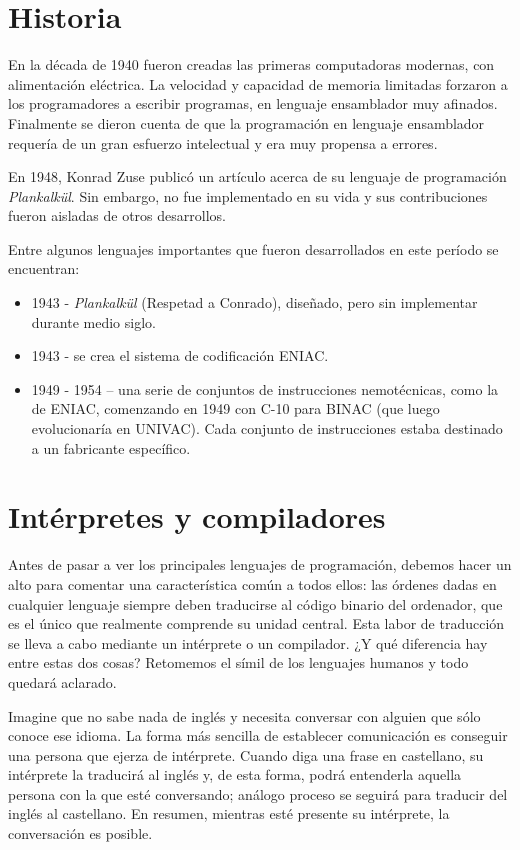 \documentclass[twoside,twocolumn]{article}
\begin{document}
\section{Historia}

En la década de 1940 fueron creadas las primeras computadoras modernas, con alimentación eléctrica. La velocidad y capacidad de memoria limitadas forzaron a los programadores a escribir programas, en lenguaje ensamblador muy afinados. Finalmente se dieron cuenta de que la programación en lenguaje ensamblador requería de un gran esfuerzo intelectual y era muy propensa a errores.

En 1948, Konrad Zuse publicó un artículo acerca de su lenguaje de programación \textit{Plankalkül}. Sin embargo, no fue implementado en su vida y sus contribuciones fueron aisladas de otros desarrollos.

Entre algunos lenguajes importantes que fueron desarrollados en este período se encuentran: 
\begin{itemize}
\item     1943 - \textit{Plankalkül} (Respetad a Conrado), diseñado, pero sin implementar durante medio siglo.
\item   1943 - se crea el sistema de codificación ENIAC.
\item  1949 - 1954 -- una serie de conjuntos de instrucciones nemotécnicas, como la de ENIAC, comenzando en 1949 con C-10 para BINAC (que luego evolucionaría en UNIVAC). Cada conjunto de instrucciones estaba destinado a un fabricante específico.
\end{itemize}





\section{Intérpretes y compiladores}

Antes de pasar a ver los principales lenguajes de
programación, debemos hacer un alto para comentar
una característica común a todos ellos: las órdenes
dadas en cualquier lenguaje siempre deben traducirse
al código binario del ordenador, que es el único que
realmente comprende su unidad central. Esta labor de
traducción se lleva a cabo mediante un intérprete o un
compilador. ¿Y qué diferencia hay entre estas dos
cosas? Retomemos el símil de los lenguajes humanos y
todo quedará aclarado.

Imagine que no sabe nada de inglés y necesita conversar con alguien que sólo conoce ese idioma. La
forma más sencilla de establecer comunicación es conseguir una persona que ejerza de intérprete. Cuando
diga una frase en castellano, su intérprete la traducirá
al inglés y, de esta forma, podrá entenderla aquella
persona con la que esté conversando; análogo proceso
se seguirá para traducir del inglés al castellano. En
resumen, mientras esté presente su intérprete, la conversación es posible.
\end{document}
